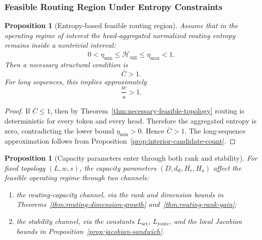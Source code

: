 \documentclass{article}
\theoremstyle{plain}
\newtheorem{proposition}[theorem]{Proposition}
\theoremstyle{definition}
\theoremstyle{remark}
\begin{document}
\subsubsection{Feasible Routing Region Under Entropy Constraints}
\label{sec:tier-b-feasible-routing}

\begin{proposition}[Entropy-based feasible routing region]
\label{prop:entropy-feasible-routing}
Assume that in the operating regime of interest the head-aggregated normalized routing entropy remains inside a nontrivial interval:
\begin{equation}
\label{eq:entropy-interval-feasible}
0<\eta_{\min}\le \overline{\mathcal{H}}_{\mathrm{agg}} \le \eta_{\max}<1.
\end{equation}
Then a necessary structural condition is
\begin{equation}
\label{eq:entropy-feasible-cbar}
\bar{C}>1.
\end{equation}
For long sequences, this implies approximately
\begin{equation}
\label{eq:entropy-feasible-ws}
\frac{w}{s}>1.
\end{equation}
\end{proposition}

\begin{proof}
If $\bar{C}\le 1$, then by Theorem~\ref{thm:necessary-feasible-topology} routing is deterministic for every token and every head. Therefore the aggregated entropy is zero, contradicting the lower bound $\eta_{\min}>0$. Hence $\bar{C}>1$. The long-sequence approximation follows from Proposition~\ref{prop:interior-candidate-count}.
\end{proof}

\begin{proposition}[Capacity parameters enter through both rank and stability]
\label{prop:capacity-stability}
For fixed topology $(L,w,s)$, the capacity parameters $(D,d_{\mathrm{ff}},H_r,H_a)$ affect the feasible operating regime through two channels:
\begin{enumerate}
    \item the routing-capacity channel, via the rank and dimension bounds in Theorems~\ref{thm:routing-dimension-growth} and~\ref{thm:routing-rank-gain};
    \item the stability channel, via the constants $L_{\mathrm{set}}$, $L_{\mathrm{route}}$, and the local Jacobian bounds in Proposition~\ref{prop:jacobian-sandwich}.
\end{enumerate}
\end{proposition}
\end{document}
